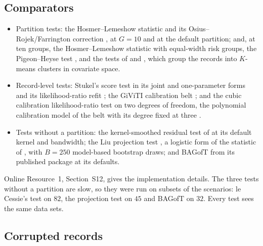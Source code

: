 \subsection{Comparators}\label{sec:comparators}

\begin{itemize}
\item Partition tests: the Hosmer--Lemeshow statistic and its Osius--Rojek/Farrington correction
      \EFname{} \citep{hosmer1980goodness,osius1992normal,farrington1996}, at $G=10$ and at the default
      partition; and, at ten groups, the Hosmer--Lemeshow statistic with equal-width risk groups, the
      Pigeon--Heyse test \citep{pigeon1999b}, and the tests of \citet{Tsiatis1980} and
      \citet{xie2008increasing}, which group the records into $K$-means clusters in covariate space.
\item Record-level tests: Stukel's score test in its joint and one-parameter forms and its
      likelihood-ratio refit \citep{stukel1988generalized}; the GiViTI calibration belt
      \citep{nattino2014new,nattino2015new}; and the cubic calibration likelihood-ratio test on two
      degrees of freedom, the polynomial calibration model of the belt with its degree fixed at three
      \citep{pregibon1980goodness}.
\item Tests without a partition: the kernel-smoothed residual test of
      \citet{le1991goodness,le1995goodness} at its default kernel and bandwidth; the Liu projection test
      \citep{liu2024comprehensive}, a logistic form of the statistic of
      \citet{escanciano2006consistent}, with $B=250$ model-based bootstrap draws; and BAGofT
      \citep{BAGofT2019} from its published package at its defaults.
\end{itemize}
Online Resource~1, Section~S12, gives the implementation details. The three tests without a partition
are slow, so they were run on subsets of the scenarios: le Cessie's test on $82$, the projection test
on $45$ and BAGofT on $32$. Every test sees the same data sets.

\subsection{Corrupted records}\label{sec:contamination-design}

